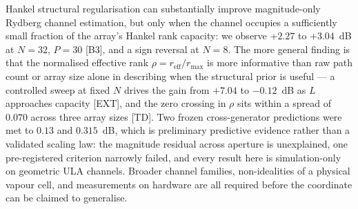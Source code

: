 \documentclass[conference]{IEEEtran}
\newcommand{\rmax}{r_{\max}}
\newcommand{\reff}{r_{\mathrm{eff}}}
\begin{document}
Hankel structural regularisation can substantially improve magnitude-only
Rydberg channel estimation, but only when the channel occupies a sufficiently
small fraction of the array's Hankel rank capacity: we observe
$+2.27$ to $+3.04$~dB at $N=32$, $P=30$ [B3], and a sign reversal at $N=8$.
The more general finding is that the normalised effective rank
$\rho=\reff/\rmax$ is more informative than raw path count or array size alone
in describing when the structural prior is useful --- a controlled sweep at
fixed $N$ drives the gain from $+7.04$ to $-0.12$~dB as $L$ approaches capacity
[EXT], and the zero crossing in $\rho$ sits within a spread of $0.070$ across
three array sizes [TD]. Two frozen cross-generator predictions were met to
$0.13$ and $0.315$~dB, which is preliminary predictive evidence rather than a
validated scaling law: the magnitude residual across aperture is unexplained,
one pre-registered criterion narrowly failed, and every result here is
simulation-only on geometric ULA channels. Broader channel families,
non-idealities of a physical vapour cell, and measurements on hardware are all
required before the coordinate can be claimed to generalise.
\end{document}
